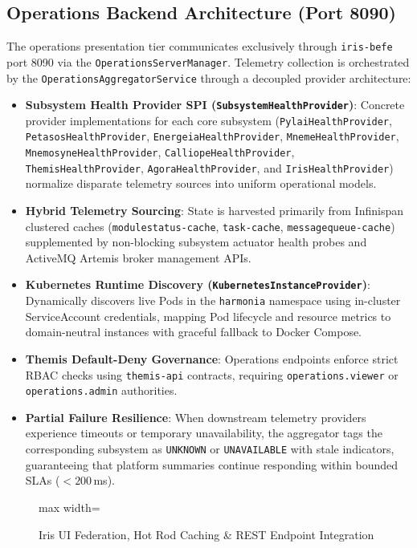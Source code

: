 \subsection{Operations Backend Architecture (Port 8090)}
The operations presentation tier communicates exclusively through \texttt{iris-befe} port 8090 via the \texttt{OperationsServerManager}. Telemetry collection is orchestrated by the \texttt{OperationsAggregatorService} through a decoupled provider architecture:
\begin{itemize}
    \item \textbf{Subsystem Health Provider SPI (\texttt{SubsystemHealthProvider})}: Concrete provider implementations for each core subsystem (\texttt{PylaiHealthProvider}, \texttt{PetasosHealthProvider}, \texttt{EnergeiaHealthProvider}, \texttt{MnemeHealthProvider}, \texttt{MnemosyneHealthProvider}, \texttt{CalliopeHealthProvider}, \texttt{ThemisHealthProvider}, \texttt{AgoraHealthProvider}, and \texttt{IrisHealthProvider}) normalize disparate telemetry sources into uniform operational models.
    \item \textbf{Hybrid Telemetry Sourcing}: State is harvested primarily from Infinispan clustered caches (\texttt{modulestatus-cache}, \texttt{task-cache}, \texttt{messagequeue-cache}) supplemented by non-blocking subsystem actuator health probes and ActiveMQ Artemis broker management APIs.
    \item \textbf{Kubernetes Runtime Discovery (\texttt{KubernetesInstanceProvider})}: Dynamically discovers live Pods in the \texttt{harmonia} namespace using in-cluster ServiceAccount credentials, mapping Pod lifecycle and resource metrics to domain-neutral instances with graceful fallback to Docker Compose.
    \item \textbf{Themis Default-Deny Governance}: Operations endpoints enforce strict RBAC checks using \texttt{themis-api} contracts, requiring \texttt{operations.viewer} or \texttt{operations.admin} authorities.
    \item \textbf{Partial Failure Resilience}: When downstream telemetry providers experience timeouts or temporary unavailability, the aggregator tags the corresponding subsystem as \texttt{UNKNOWN} or \texttt{UNAVAILABLE} with stale indicators, guaranteeing that platform summaries continue responding within bounded SLAs ($< 200$\,ms).
\end{itemize}

\begin{figure}[htbp]
    \centering
    \begin{adjustbox}{max width=\textwidth}
        
    \end{adjustbox}
    \caption{Iris UI Federation, Hot Rod Caching \& REST Endpoint Integration}
    \label{fig:iris_federation}
\end{figure}

